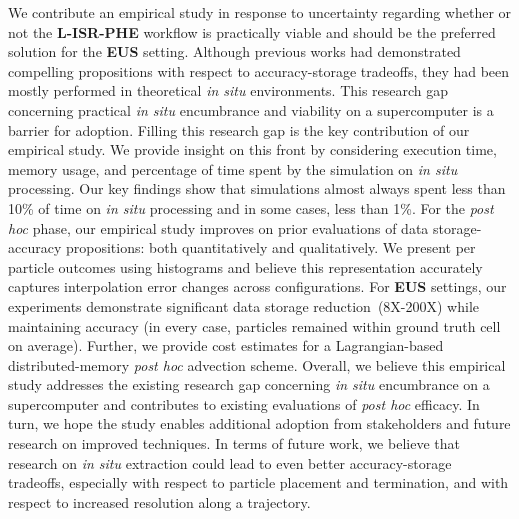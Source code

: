 We contribute an empirical study in response to uncertainty
regarding whether or not the \textbf{L-ISR-PHE} workflow is practically viable and should be
the preferred solution for the \textbf{EUS} setting.
%
%
Although previous works had demonstrated compelling propositions with respect
to accuracy-storage tradeoffs, they had been mostly performed
in theoretical \textit{in situ} environments.
%
This research gap concerning practical \textit{in situ} encumbrance and viability on a supercomputer is a barrier for adoption. 
%
Filling this research gap is the key contribution of our empirical study. 
%
We provide insight on this front by considering execution time, memory usage, and percentage of time spent by the simulation on \textit{in situ} processing.
%
Our key findings show that simulations almost always spent less than 10\% of time on \textit{in situ} processing and in some cases, less than 1\%.
%
For the \textit{post hoc} phase, our empirical study improves on prior evaluations of data storage-accuracy propositions: both quantitatively and qualitatively.
%
We present per particle outcomes using histograms and believe this representation accurately captures interpolation error changes across configurations.
%
For \textbf{EUS} settings, our experiments demonstrate significant data storage reduction~(8X-200X) while maintaining accuracy (in every case, particles remained within ground truth cell on average).
%
Further, we provide cost estimates for a Lagrangian-based distributed-memory \textit{post hoc} advection scheme.
%
%
%
Overall, we believe this empirical study addresses the existing research gap 
concerning \textit{in situ} encumbrance on a supercomputer and contributes to existing evaluations of \textit{post hoc} efficacy.
%
In turn, we hope the study enables additional adoption from stakeholders
and future research on improved techniques.
%
%
%
In terms of future work, we believe that research on \textit{in situ}
extraction could lead to even better accuracy-storage tradeoffs,
especially with respect to particle placement and termination, and with
respect to increased resolution along a trajectory.
%

